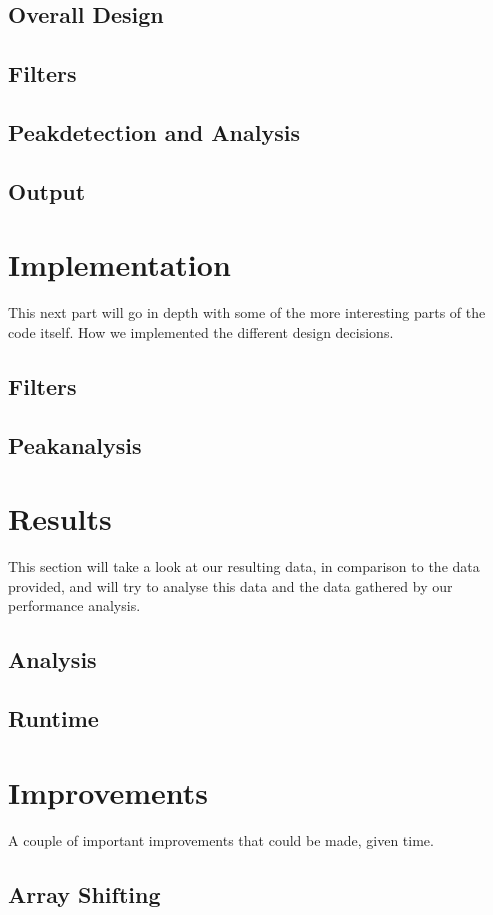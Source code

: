 \documentclass[12pt, danish, a4paper, titlepage]{article}
\begin{document}
		\subsection{Overall Design}
		\subsection{Filters}
		\subsection{Peakdetection and Analysis}
		\subsection{Output}
		
	\section{Implementation}
	This next part will go in depth with some of the more interesting parts of the code itself. How we implemented the different design decisions.  
		\subsection{Filters}
		\subsection{Peakanalysis}
		
	\section{Results}
	This section will take a look at our resulting data, in comparison to the data provided, and will try to analyse this data and the data gathered by our performance analysis. 
		\subsection{Analysis}
		\subsection{Runtime}
		
	\section{Improvements}
	A couple of important improvements that could be made, given time.
		\subsection{Array Shifting}
\end{document}
